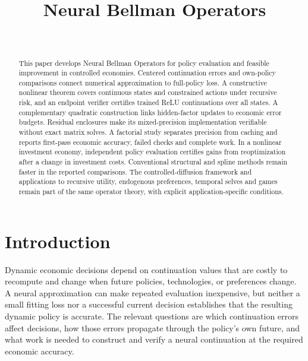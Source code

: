 \documentclass[ecta,nameyear,draft]{econsocart}
\theoremstyle{definition}
\theoremstyle{remark}
\begin{document}
\begin{frontmatter}
\title{Neural Bellman Operators}
\begin{aug}
\author[id=au1,addressref={add1}]{~}
\address[id=add1]{Peking University}
\end{aug}
\begin{abstract}
This paper develops Neural Bellman Operators for policy evaluation and feasible improvement in controlled economies. Centered continuation errors and own-policy comparisons connect numerical approximation to full-policy loss. A constructive nonlinear theorem covers continuous states and constrained actions under recursive risk, and an endpoint verifier certifies trained ReLU continuations over all states. A complementary quadratic construction links hidden-factor updates to economic error budgets. Residual enclosures make its mixed-precision implementation verifiable without exact matrix solves. A factorial study separates precision from caching and reports first-pass economic accuracy, failed checks and complete work. In a nonlinear investment economy, independent policy evaluation certifies gains from reoptimization after a change in investment costs. Conventional structural and spline methods remain faster in the reported comparisons. The controlled-diffusion framework and applications to recursive utility, endogenous preferences, temporal selves and games remain part of the same operator theory, with explicit application-specific conditions.
\end{abstract}
\begin{keyword}
\end{keyword}
\end{frontmatter}
\section{Introduction}\label{sec:r37intro}
Dynamic economic decisions depend on continuation values that are costly to
recompute and change when future policies, technologies, or preferences
change. A neural approximation can make repeated evaluation inexpensive, but
neither a small fitting loss nor a successful current decision establishes
that the resulting dynamic policy is accurate. The relevant questions are
which continuation errors affect decisions, how those errors propagate
through the policy's own future, and what work is needed to construct and
verify a neural continuation at the required economic accuracy.
\end{document}
